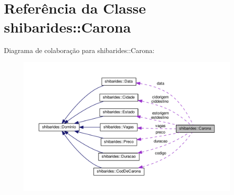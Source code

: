 \hypertarget{classshibarides_1_1Carona}{}\section{Referência da Classe shibarides\+:\+:Carona}
\label{classshibarides_1_1Carona}


Diagrama de colaboração para shibarides\+:\+:Carona\+:
\nopagebreak
\begin{figure}[H]
\begin{center}
\leavevmode
\includegraphics[width=350pt]{classshibarides_1_1Carona__coll__graph}
\end{center}
\end{figure}

